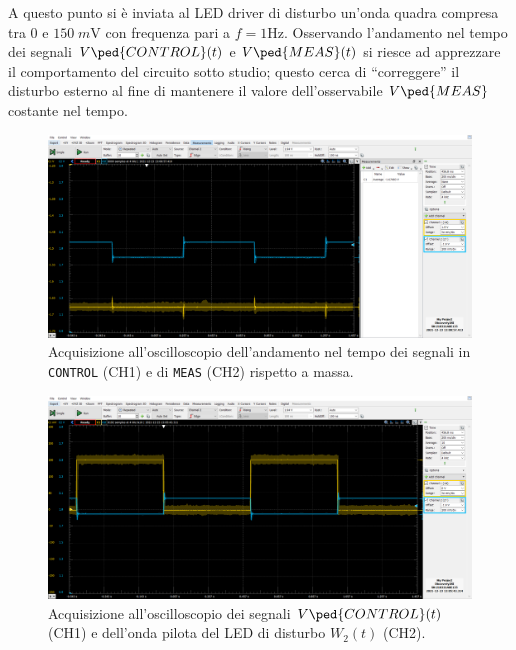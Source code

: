\documentclass[10pt, a4paper, italian]{article}
\begin{document}
A questo punto si è inviata al LED driver di disturbo un'onda quadra compresa
tra $0$ e $150 \; \si{m\V}$ con frequenza pari a $f = 1 \si{\Hz}$.
Osservando l'andamento nel tempo dei segnali $V\ped{CONTROL} (t)$ e
$V\ped{MEAS} (t)$ si riesce ad apprezzare il comportamento del circuito sotto
studio; questo cerca di ``correggere'' il disturbo esterno al fine di
mantenere il valore dell'osservabile $V\ped{MEAS}$ costante nel tempo.
\begin{figure}[htbp]
    \centering
	\includegraphics[width=\textwidth]{control7.meas}
    \caption{Acquisizione all'oscilloscopio dell'andamento nel tempo dei
    segnali in \texttt{CONTROL} (CH1) e di \texttt{MEAS} (CH2) rispetto a
    massa.
    \label{fig: ctrlmeas}}
\end{figure}
\begin{figure}[htbp]
    \centering
	\includegraphics[width=\textwidth]{control7}
    \caption{Acquisizione all'oscilloscopio dei segnali $V\ped{CONTROL} (t)$
    (CH1) e dell'onda pilota del LED di disturbo $W_2 (t)$ (CH2).
    \label{fig: ctrlnoise}}
\end{figure}
\end{document}
